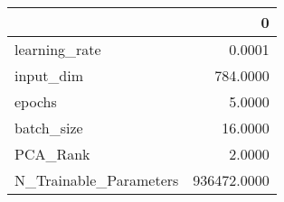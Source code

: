 \begin{tabular}{lr}
\toprule
{} &            0 \\
\midrule
learning\_rate          &       0.0001 \\
input\_dim              &     784.0000 \\
epochs                 &       5.0000 \\
batch\_size             &      16.0000 \\
PCA\_Rank               &       2.0000 \\
N\_Trainable\_Parameters &  936472.0000 \\
\bottomrule
\end{tabular}
